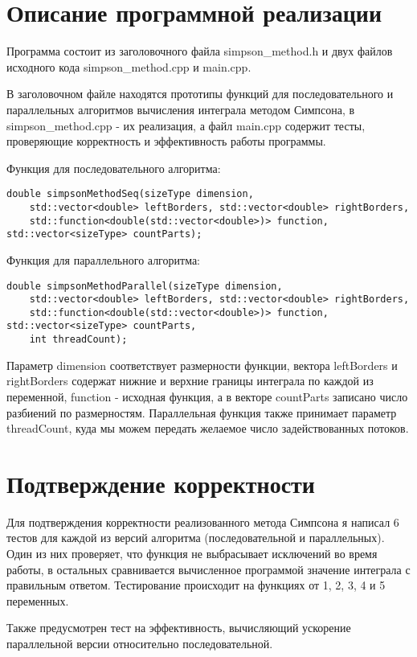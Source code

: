 \documentclass{report}
\begin{document}
\section*{Описание программной реализации}
Программа состоит из заголовочного файла simpson\_method.h и двух файлов исходного кода simpson\_method.cpp и main.cpp.
\par В заголовочном файле находятся прототипы функций для последовательного и параллельных алгоритмов вычисления интеграла методом Симпсона, в simpson\_method.cpp - их реализация, а файл main.cpp содержит тесты, проверяющие корректность и эффективность работы программы.
\par Функция для последовательного алгоритма:
\begin{lstlisting}
double simpsonMethodSeq(sizeType dimension,
    std::vector<double> leftBorders, std::vector<double> rightBorders,
    std::function<double(std::vector<double>)> function, std::vector<sizeType> countParts);
\end{lstlisting}
\par Функция для параллельного алгоритма:
\begin{lstlisting}
double simpsonMethodParallel(sizeType dimension,
    std::vector<double> leftBorders, std::vector<double> rightBorders,
    std::function<double(std::vector<double>)> function, std::vector<sizeType> countParts,
    int threadCount);
\end{lstlisting}
\par Параметр dimension соответствует размерности функции, вектора leftBorders и rightBorders содержат нижние и верхние границы интеграла по каждой из переменной, function - исходная функция, а в векторе countParts записано число разбиений по размерностям. Параллельная функция также принимает параметр threadCount, куда мы можем передать желаемое число задействованных потоков.
\newpage

\section*{Подтверждение корректности}
Для подтверждения корректности реализованного метода Симпсона я написал 6 тестов для каждой из версий алгоритма (последовательной и параллельных). Один из них проверяет, что функция не выбрасывает исключений во время работы, в остальных сравнивается вычисленное программой значение интеграла с правильным ответом. Тестирование происходит на функциях от 1, 2, 3, 4 и 5 переменных.
\par Также предусмотрен тест на эффективность, вычисляющий ускорение параллельной версии относительно последовательной.
\newpage
\end{document}
